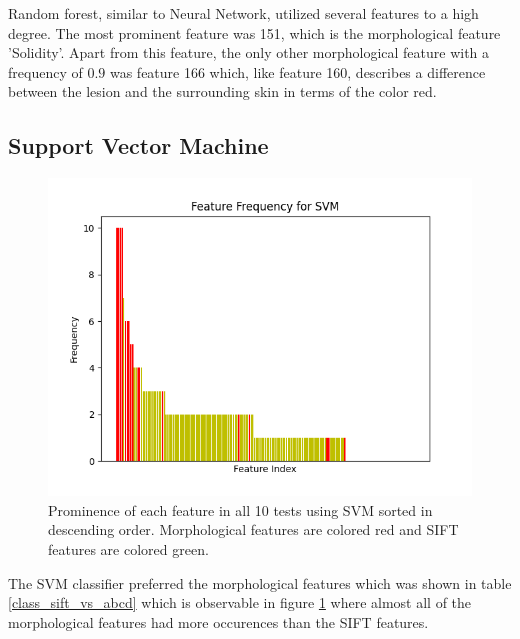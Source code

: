 \documentclass{kththesis}
\begin{document}
Random forest, similar to Neural Network, utilized several features to a high degree. The most prominent feature was 151, which is the morphological feature 'Solidity'. Apart from this feature, the only other morphological feature with a frequency of $0.9$ was feature 166 which, like feature 160, describes a difference between the lesion and the surrounding skin in terms of the color red.


\newpage

\subsection{Support Vector Machine}

\begin{figure}[h!]
  \centering
  \includegraphics[scale=0.8]{figures/svm_all_freqs.png}
  \caption{Prominence of each feature in all 10 tests using SVM sorted in descending order. Morphological features are colored red and SIFT features are colored green.}
  \label{fig:freq_svm}
\end{figure}

The SVM classifier preferred the morphological features which was shown in table \ref{class_sift_vs_abcd} which is observable in figure \ref{fig:freq_svm} where almost all of the morphological features had more occurences than the SIFT features. 

\newpage
\end{document}
